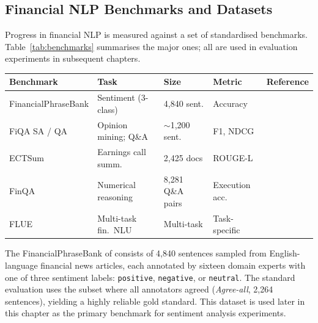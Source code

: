 \begin{context}
\subsection{Financial NLP Benchmarks and Datasets}
\label{sec:landscape-benchmarks}

Progress in financial NLP is measured against a set of standardised benchmarks.
Table~\ref{tab:benchmarks} summarises the major ones; all are used in evaluation
experiments in subsequent chapters.

\begin{center}
\small
\begin{tabularx}{\linewidth}{l X l l X}
\hline
\textbf{Benchmark} & \textbf{Task} & \textbf{Size} & \textbf{Metric} &
\textbf{Reference} \\
\hline
FinancialPhraseBank & Sentiment (3-class)  & 4,840 sent.       & Accuracy       & \cite{malo2014phrasebank} \\
FiQA SA / QA        & Opinion mining; Q\&A & $\sim$1,200 sent. & F1, NDCG       & \cite{fiqa2018} \\
ECTSum              & Earnings call summ.  & 2,425 docs        & ROUGE-L        & \cite{mukherjee2022ectsum} \\
FinQA               & Numerical reasoning  & 8,281 Q\&A pairs  & Execution acc. & \cite{chen2021finqa} \\
FLUE                & Multi-task fin.\ NLU & Multi-task        & Task-specific  & \cite{shah2022flue} \\
\hline
\end{tabularx}
\label{tab:benchmarks}
\end{center}

The FinancialPhraseBank of \citet{malo2014phrasebank} consists of 4,840 sentences sampled
from English-language financial news articles, each annotated by sixteen domain experts
with one of three sentiment labels: \texttt{positive}, \texttt{negative}, or
\texttt{neutral}.  The standard evaluation uses the subset where all annotators agreed
(\emph{Agree-all}, 2,264 sentences), yielding a highly reliable gold standard.  This
dataset is used later in this chapter as the primary benchmark for sentiment analysis experiments.


\end{context}
